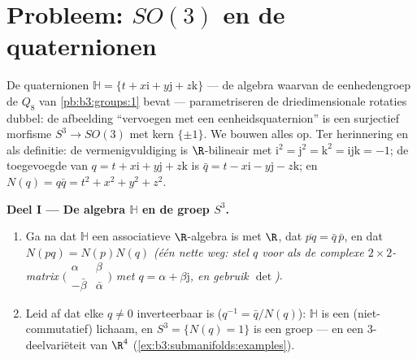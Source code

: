 \section{Probleem: \texorpdfstring{$SO(3)$}{SO(3)} en de
quaternionen}

\begin{problem}\label{pb:b3:submanifolds:1}
De quaternionen $\mathbb H = \{t + x\mathrm i + y\mathrm j +
z\mathrm k\}$ --- de algebra waarvan de eenhedengroep de $Q_8$
van \cref{pb:b3:groups:1} bevat --- parametriseren de
driedimensionale rotaties dubbel: de afbeelding ``vervoegen met
een eenheidsquaternion'' is een surjectief morfisme $S^3 \to
SO(3)$ met kern $\{\pm1\}$. We bouwen alles op. Ter herinnering
en als definitie: de vermenigvuldiging is $\R$-bilineair met
$\mathrm i^2 = \mathrm j^2 = \mathrm k^2 = \mathrm{ijk} = -1$; de
toegevoegde van $q = t + x\mathrm i + y\mathrm j + z\mathrm k$ is
$\bar q = t - x\mathrm i - y\mathrm j - z\mathrm k$; en $N(q) =
q\bar q = t^2 + x^2 + y^2 + z^2$.

\medskip
\noindent\textbf{Deel I --- De algebra $\mathbb H$ en de groep
$S^3$.}
\begin{enumerate}
  \item Ga na dat $\mathbb H$ een associatieve $\R$-algebra is
        met  $\R$, dat $\overline{pq} = \bar q\,\bar p$,
        en dat $N(pq) = N(p)N(q)$ \emph{(één nette weg: stel $q$
        voor als de complexe $2\times2$-matrix
        $\bigl(\begin{smallmatrix}\alpha & \beta\\
        -\bar\beta & \bar\alpha\end{smallmatrix}\bigr)$ met $q =
        \alpha + \beta\mathrm j$, en gebruik $\det$)}.
  \item Leid af dat elke $q \neq 0$ inverteerbaar is ($q^{-1} =
        \bar q/N(q)$): $\mathbb H$ is een (niet-commutatief)
        lichaam, en $S^3 = \{N(q) = 1\}$ is een groep --- en een
         $3$-deelvariëteit van $\R^4$
        (\cref{ex:b3:submanifolds:examples}).
\end{enumerate}


\end{problem}
